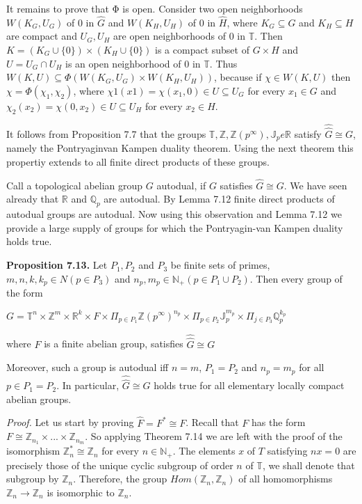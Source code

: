 \documentclass[12pt]{article}
\begin{document}
    It remains to prove that Φ is open. Consider two open neighborhoods $W(K_G, U_G)$ of 0 in $\hat{G}$ and $W(K_H, U_H)$
of 0 in $\hat{H}$, where $K_G \subseteq G$ and $K_H \subseteq H$ are compact and $U_G, U_H$ are open neighborhoods of 0 in $\mathbb{T}$. Then
$K = (K_G \cup \{0\}) \times (K_H \cup \{0\})$ is a compact subset of $G \times H$ and $U = U_G \cap U_H$ is an open neighborhood of
0 in $\mathbb{T}$. Thus $W(K, U) \subseteq \Phi(W(K_G, U_G) \times W(K_H, U_H))$, because if $\chi \in W(K, U)$ then $\chi = \Phi(\chi_1, \chi_2)$, where
$χ1(x1) = \chi(x_1, 0) \in U \subseteq U_G$ for every $x_1 \in G$ and $\chi_2(x_2) = \chi(0, x_2) \in U \subseteq U_H$ for every $x_2 \in H$.


    It follows from Proposition 7.7 that the groups $\mathbb{T}, \mathbb{Z}, \mathbb{Z}(p^{\infty}), \mathbb{J}_p e \mathbb{R}$ satisfy $\hat{\hat{G}} \cong G$, namely the 
Pontryaginvan Kampen duality theorem. Using the next theorem this propertiy extends to all finite direct products of
these groups.


    Call a topological abelian group $G$ autodual, if $G$ satisfies $\hat{G} \cong G$. We have seen already that $\mathbb{R}$ and $\mathbb{Q}_p$ are
autodual. By Lemma 7.12 finite direct products of autodual groups are autodual. Now using this observation
and Lemma 7.12 we provide a large supply of groups for which the Pontryagin-van Kampen duality holds true.


\textbf{Proposition 7.13.} Let $P_1, P_2$ and $P_3$ be finite sets of primes, $m, n, k, k_p \in N (p \in P_3)$ and
$n_p, m_p \in \mathbb{N}_+ (p \in P_1 \cup P_2)$. Then every group of the form


    $G = \mathbb{T}^n \times \mathbb{Z}^m \times \mathbb{R}^k \times F \times \Pi_{p \in P_1} \mathbb{Z} (p^{\infty})^{n_p} \times \Pi_{p \in P_2} \mathbb{J}_{p}^{m_p} \times \Pi_{j \in P_3} \mathbb{Q}_{p}^{k_p}$


where $F$ is a finite abelian group, satisfies $\hat{\hat{G}} \cong G$


Moreover, such a group is autodual iff $n = m$, $P_1 = P_2$ and $n_p = m_p$ for all $p \in P_1 = P_2$. In particular,
$\hat{\hat{G}} \cong G$ holds true for all elementary locally compact abelian groups.


\emph{Proof.} Let us start by proving $\hat{F} = F^* \cong F$. Recall that $F$ has the form $F \cong \mathbb{Z}_{n_1} \times . . . \times \mathbb{Z}_{n_m}$. So applying
Theorem 7.14 we are left with the proof of the isomorphism $\mathbb{Z}^*_n \cong \mathbb{Z}_n$ for every $n \in \mathbb{N}_+$. The elements $x$ of
$T$ satisfying $nx = 0$ are precisely those of the unique cyclic subgroup of order $n$ of $\mathbb{T}$, we shall denote that
subgroup by $\mathbb{Z}_n$. Therefore, the group $Hom(\mathbb{Z}_n,\mathbb{Z}_n)$ of all homomorphisms $\mathbb{Z}_n \to \mathbb{Z}_n$ is isomorphic to $\mathbb{Z}_n$.
\end{document}
